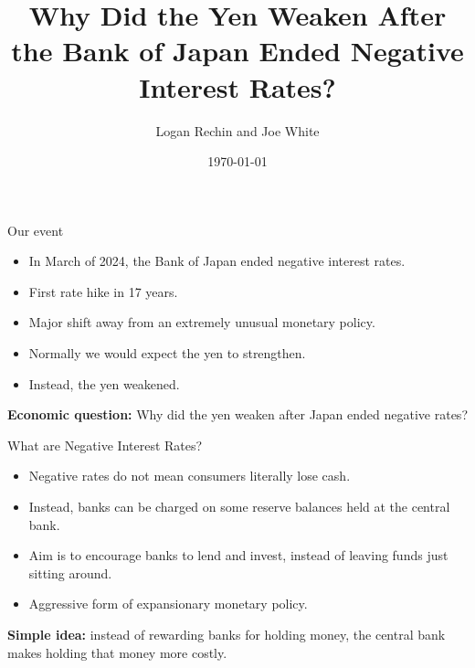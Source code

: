 \documentclass{beamer}
\title[BOJ and the Yen]{Why Did the Yen Weaken After the Bank of Japan Ended Negative Interest Rates?}
\author[Logan Rechin and Joe White]{Logan Rechin and Joe White}
\institute[Miami University]{Miami University \\ ECO 442}
\date{\today}
\begin{document}

\frame{\titlepage}


\begin{frame}[t]{Our event}

\begin{itemize}
    \setlength{\itemsep}{0.9em}
    
    \item In March of 2024, the Bank of Japan ended negative interest rates.
    
    \item First rate hike in 17 years.
   
    \item Major shift away from an extremely unusual monetary policy.
    
    \item Normally we would expect the yen to strengthen.
    
    
    \item Instead, the yen weakened.
    
\end{itemize}

\vspace{0.6em}

\textbf{Economic question:} Why did the yen weaken after Japan ended negative rates?

\end{frame}


\begin{frame}[t]{What are Negative Interest Rates?}

\begin{itemize}
    \setlength{\itemsep}{0.9em}
    
    \item Negative rates do not mean consumers literally lose cash.
    
    \item Instead, banks can be charged on some reserve balances held at the central bank.
    
    \item Aim is to encourage banks to lend and invest, instead of leaving funds just sitting around.
    
    \item Aggressive form of expansionary monetary policy.
    
\end{itemize}

\vspace{0.6em}

\textbf{Simple idea:} instead of rewarding banks for holding money, the central bank makes holding that money more costly.

\end{frame}
\end{document}
